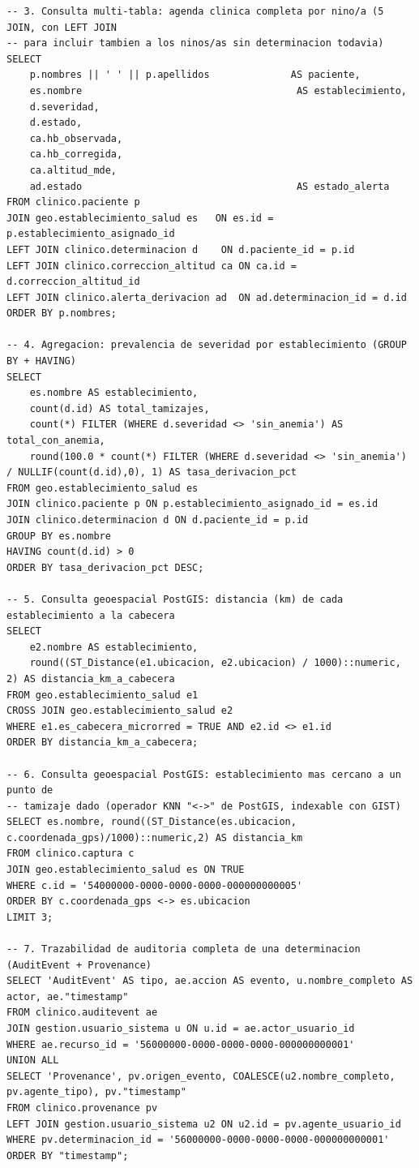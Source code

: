 \documentclass[11pt,a4paper]{article}
\begin{document}
\begin{samepage}
\begin{verbatim}
-- 3. Consulta multi-tabla: agenda clinica completa por nino/a (5 JOIN, con LEFT JOIN
-- para incluir tambien a los ninos/as sin determinacion todavia)
SELECT
    p.nombres || ' ' || p.apellidos              AS paciente,
    es.nombre                                     AS establecimiento,
    d.severidad,
    d.estado,
    ca.hb_observada,
    ca.hb_corregida,
    ca.altitud_mde,
    ad.estado                                     AS estado_alerta
FROM clinico.paciente p
JOIN geo.establecimiento_salud es   ON es.id = p.establecimiento_asignado_id
LEFT JOIN clinico.determinacion d    ON d.paciente_id = p.id
LEFT JOIN clinico.correccion_altitud ca ON ca.id = d.correccion_altitud_id
LEFT JOIN clinico.alerta_derivacion ad  ON ad.determinacion_id = d.id
ORDER BY p.nombres;

-- 4. Agregacion: prevalencia de severidad por establecimiento (GROUP BY + HAVING)
SELECT
    es.nombre AS establecimiento,
    count(d.id) AS total_tamizajes,
    count(*) FILTER (WHERE d.severidad <> 'sin_anemia') AS total_con_anemia,
    round(100.0 * count(*) FILTER (WHERE d.severidad <> 'sin_anemia') / NULLIF(count(d.id),0), 1) AS tasa_derivacion_pct
FROM geo.establecimiento_salud es
JOIN clinico.paciente p ON p.establecimiento_asignado_id = es.id
JOIN clinico.determinacion d ON d.paciente_id = p.id
GROUP BY es.nombre
HAVING count(d.id) > 0
ORDER BY tasa_derivacion_pct DESC;

-- 5. Consulta geoespacial PostGIS: distancia (km) de cada establecimiento a la cabecera
SELECT
    e2.nombre AS establecimiento,
    round((ST_Distance(e1.ubicacion, e2.ubicacion) / 1000)::numeric, 2) AS distancia_km_a_cabecera
FROM geo.establecimiento_salud e1
CROSS JOIN geo.establecimiento_salud e2
WHERE e1.es_cabecera_microrred = TRUE AND e2.id <> e1.id
ORDER BY distancia_km_a_cabecera;

-- 6. Consulta geoespacial PostGIS: establecimiento mas cercano a un punto de
-- tamizaje dado (operador KNN "<->" de PostGIS, indexable con GIST)
SELECT es.nombre, round((ST_Distance(es.ubicacion, c.coordenada_gps)/1000)::numeric,2) AS distancia_km
FROM clinico.captura c
JOIN geo.establecimiento_salud es ON TRUE
WHERE c.id = '54000000-0000-0000-0000-000000000005'
ORDER BY c.coordenada_gps <-> es.ubicacion
LIMIT 3;

-- 7. Trazabilidad de auditoria completa de una determinacion (AuditEvent + Provenance)
SELECT 'AuditEvent' AS tipo, ae.accion AS evento, u.nombre_completo AS actor, ae."timestamp"
FROM clinico.auditevent ae
JOIN gestion.usuario_sistema u ON u.id = ae.actor_usuario_id
WHERE ae.recurso_id = '56000000-0000-0000-0000-000000000001'
UNION ALL
SELECT 'Provenance', pv.origen_evento, COALESCE(u2.nombre_completo, pv.agente_tipo), pv."timestamp"
FROM clinico.provenance pv
LEFT JOIN gestion.usuario_sistema u2 ON u2.id = pv.agente_usuario_id
WHERE pv.determinacion_id = '56000000-0000-0000-0000-000000000001'
ORDER BY "timestamp";


\end{verbatim}
\end{samepage}
\end{document}
